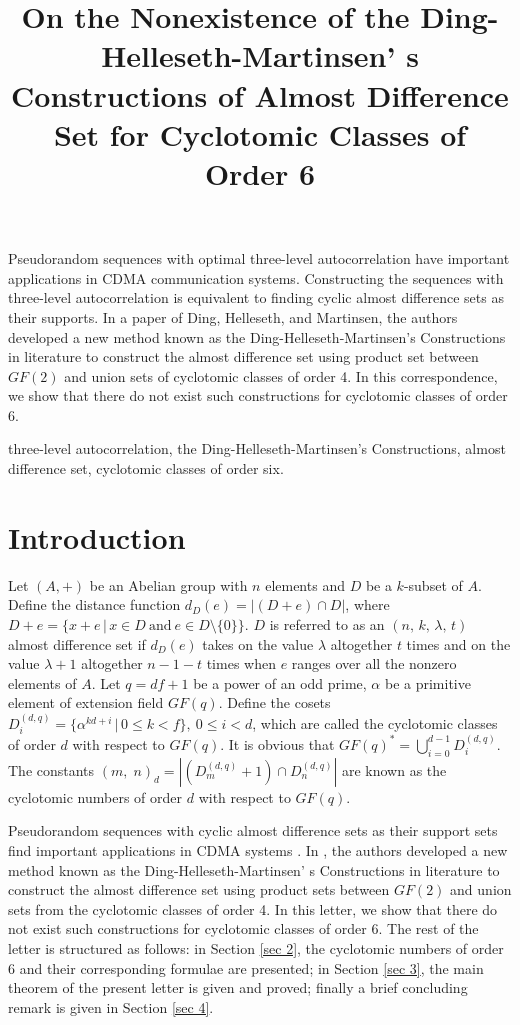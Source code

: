 \documentclass[letter]{ieice}
\title{On the Nonexistence of the Ding-Helleseth-Martinsen' s Constructions of Almost Difference Set for Cyclotomic Classes of Order 6}
\begin{document}
\maketitle
\begin{summary}
Pseudorandom sequences with optimal three-level autocorrelation have important applications in CDMA communication systems. Constructing the sequences with three-level autocorrelation is equivalent to finding cyclic almost difference sets as their supports. In a paper of Ding, Helleseth, and Martinsen, the authors developed a new method known as the Ding-Helleseth-Martinsen’s Constructions in literature to construct the almost difference set using product set between $ GF(2) $ and union sets of cyclotomic classes of order 4. In this correspondence, we show that there do not exist such constructions for cyclotomic classes of order 6.
\end{summary}
\begin{keywords}
three-level autocorrelation, the Ding-Helleseth-Martinsen’s Constructions, almost difference set, cyclotomic classes of order six.
\end{keywords}

\section{Introduction}\label{sec 1}
Let  $ (A,+) $ be an Abelian group with $ n $ elements and $ D $ be a $ k$-subset of $ A $. Define the distance function $ d_{D}(e)=|(D+e)\cap D| $, where $ D+e=\lbrace x+e\,|\,x\in D \ \text{and}\  e\in D\setminus \lbrace 0\rbrace\rbrace$. $ D $ is referred to as an $ (n,\,k,\,\lambda,\,t) $ almost difference set if $ d_{D}(e) $ takes on the value $ \lambda $ altogether $ t $ times and on the value $ \lambda+1 $ altogether $ n-1-t $ times when $ e $  ranges over all the nonzero elements of $ A $. Let $ q=df+1 $ be a power of an odd prime, $ \alpha $ be a primitive element of extension field $ \mathit{GF}(q) $. Define the cosets $ \mathit{D}^{(d,q)}_{i}=\lbrace\alpha^{kd+i}\,|\,0\leq k<f \rbrace,\ 0\leq i<d $, which are called the cyclotomic classes of order $ d $ with respect to $ \mathit{GF}(q) $. It is obvious that $\mathit{GF}(q)^{*}=\bigcup_{i=0}^{d-1} \mathit{D}^{(d,q)}_{i} $. The constants $ (m,\;n)_{d}=|(\mathit{D}^{(d,q)}_{m}+1)\cap \mathit{D}^{(d,q)}_{n}| $ are known as the cyclotomic numbers of order $ d $ with respect to $ \mathit{GF}(q) $.

Pseudorandom sequences with cyclic almost difference sets as their support sets find important applications in CDMA systems \cite{ar05,ar06}. In \cite{ar03,ar06}, the authors developed a new method known as the Ding-Helleseth-Martinsen’ s Constructions in literature to construct the almost difference set using product sets between $ GF(2) $ and union sets from the cyclotomic classes of order 4. In this letter, we show that there do not exist such constructions for cyclotomic classes of order 6. The rest of the letter is structured as follows: in Section \ref{sec 2}, the cyclotomic numbers of order 6 and their corresponding formulae are presented; in Section \ref{sec 3}, the main theorem of the present letter is given and proved; finally a brief concluding remark is given in Section \ref{sec 4}.
\end{document}
